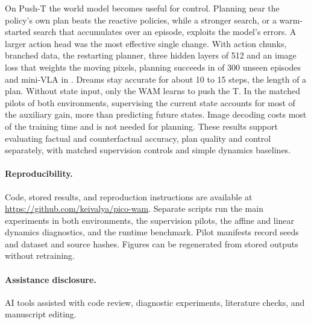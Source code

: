 \documentclass[11pt]{article}
\begin{document}
On Push-T the world model becomes useful for control. Planning near the policy's own plan beats the reactive policies, while a stronger search, or a warm-started search that accumulates over an episode, exploits the model's errors. A larger action head was the most effective single change. With action chunks, branched data, the restarting planner, three hidden layers of 512 and an image loss that weights the moving pixels, planning succeeds in \PTfinalPlanSucc{} of 300 unseen episodes and mini-VLA in \PTfinalVlaSucc. Dreams stay accurate for about 10 to 15 steps, the length of a plan. Without state input, only the WAM learns to push the T.
In the matched pilots of both environments, supervising the current state accounts for most of the auxiliary gain, more than predicting future states. Image decoding costs most of the training time and is not needed for planning. These results support evaluating factual and counterfactual accuracy, plan quality and control separately, with matched supervision controls and simple dynamics baselines.

\paragraph{Reproducibility.} Code, stored results, and reproduction instructions are available at \url{https://github.com/keivalya/pico-wam}. Separate scripts run the main experiments in both environments, the supervision pilots, the affine and linear dynamics diagnostics, and the runtime benchmark. Pilot manifests record seeds and dataset and source hashes. Figures can be regenerated from stored outputs without retraining.

\paragraph{Assistance disclosure.} AI tools assisted with code review, diagnostic experiments, literature checks, and manuscript editing.
\end{document}
